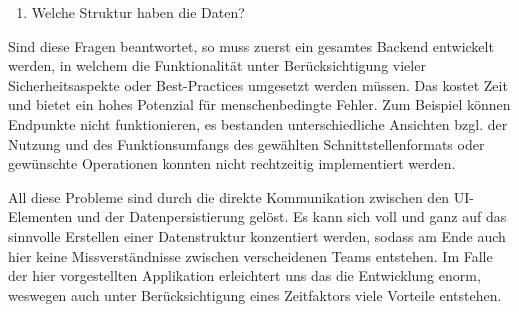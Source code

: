 \begin{definition}
\begin{enumerate}
\begin{enumerate}
                  \item Welche Struktur haben die Daten?
              \end{enumerate}
              Sind diese Fragen beantwortet, so muss zuerst ein gesamtes Backend entwickelt werden, in welchem die Funktionalität unter Berücksichtigung vieler Sicherheitsaspekte oder Best-Practices umgesetzt werden müssen. Das kostet Zeit und bietet ein hohes Potenzial für menschenbedingte Fehler. Zum Beispiel können Endpunkte nicht funktionieren, es bestanden unterschiedliche Ansichten bzgl. der Nutzung und des Funktionsumfangs des gewählten Schnittstellenformats oder gewünschte Operationen konnten nicht rechtzeitig implementiert werden.

              All diese Probleme sind durch die direkte Kommunikation zwischen den UI-Elementen und der Datenpersistierung gelöst. Es kann sich voll und ganz auf das sinnvolle Erstellen einer Datenstruktur konzentiert werden, sodass am Ende auch hier keine Missverständnisse zwischen verscheidenen Teams entstehen. Im Falle der hier vorgestellten Applikation erleichtert uns das die Entwicklung enorm, weswegen auch unter Berücksichtigung eines Zeitfaktors viele Vorteile entstehen.
    \end{enumerate}
\end{definition}
